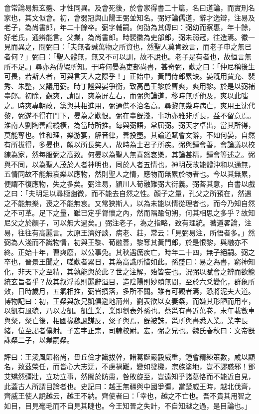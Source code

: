 \begin{pinyinscope}
會常論易無玄體、才性同異。及會死後，於會家得書二十篇，名曰道論，而實刑名家也，其文似會。初，會弱冠與山陽王弼並知名。弼好論儒道，辭才逸辯，注易及老子，為尚書郎，年二十餘卒。弼字輔嗣。何劭為其傳曰：弼幼而察惠，年十餘，好老氏，通辨能言。父業，為尚書郎。時裴徽為吏部郎，弼未弱冠，往造焉。徽一見而異之，問弼曰：「夫無者誠萬物之所資也，然聖人莫肯致言，而老子申之無已者何？」弼曰：「聖人體無，無又不可以訓，故不說也。老子是有者也，故恒言無所不足。」尋亦為傅嘏所知。于時何晏為吏部尚書，甚奇弼，歎之曰：「仲尼稱後生可畏，若斯人者，可與言天人之際乎！」正始中，黃門侍郎累缺。晏旣用賈充、裴秀、朱整，又議用弼。時丁謐與晏爭衡，致高邑王黎於曹爽，爽用黎。於是以弼補臺郎。初除，覲爽，請間，爽為屏左右，而弼與論道，移時無所他及，爽以此嗤之。時爽專朝政，黨與共相進用，弼通儁不治名高。尋黎無幾時病亡，爽用王沈代黎，弼遂不得在門下，晏為之歎恨。弼在臺旣淺，事功亦雅非所長，益不留意焉。淮南人劉陶善論縱橫，為當時所推。每與弼語，常屈弼。弼天才卓出，當其所得，莫能奪也。性和理，樂游宴，解音律，善投壺。其論道賦會文辭，不如何晏，自然有所拔得，多晏也，頗以所長笑人，故時為士君子所疾。弼與鍾會善，會論議以校練為家，然每服弼之高致。何晏以為聖人無喜怒哀樂，其論甚精，鍾會等述之。弼與不同，以為聖人茂於人者神明也，同於人者五情也，神明茂故能體沖和以通無，五情同故不能無哀樂以應物，然則聖人之情，應物而無累於物者也。今以其無累，便謂不復應物，失之多矣。弼注易，潁川人荀融難弼大衍義。弼荅其意，白書以戲之曰：「夫明足以尋極幽微，而不能去自然之性。顏子之量，孔父之所預在，然遇之不能無樂，喪之不能無哀。又常狹斯人，以為未能以情從理者也，而今乃知自然之不可革。足下之量，雖已定乎胷懷之內，然而隔踰旬朔，何其相思之多乎？故知尼父之於顏子，可以無大過矣。」弼注老子，為之指略，致有理統。著道畧論，注易，往往有高麗言。太原王濟好談，病老、莊，常云：「見弼易注，所悟者多。」然弼為人淺而不識物情，初與王黎、荀融善，黎奪其黃門郎，於是恨黎，與融亦不終。正始十年，曹爽廢，以公事免。其秋遇癘疾亡，時年二十四，無子絕嗣。弼之卒也，晉景王聞之，嗟歎者累日，其為高識所惜如此。孫盛曰：易之為書，窮神知化，非天下之至精，其孰能與於此？世之注解，殆皆妄也。況弼以賦會之辨而欲籠統玄旨者乎？故其叙浮義則麗辭溢目，造陰陽則妙賾無間，至於六爻變化，群象所效，日時歲月，五氣相推，弼皆擯落，多所不關。雖有可觀者焉，恐將泥夫大道。博物記曰：初，王粲與族兄凱俱避地荊州，劉表欲以女妻粲，而嫌其形陋而用率，以凱有風貌，乃以妻凱。凱生業，業即劉表外孫也。蔡邕有書近萬卷，末年載數車與粲，粲亡後，相國掾魏諷謀反，粲子與焉，旣被誅，邕所與書悉入業。業字長緒，位至謁者僕射。子宏字正宗，司隷校尉。宏，弼之兄也。魏氏春秋曰：文帝旣誅粲二子，以業嗣粲。

評曰：王淩風節格尚，毌丘儉才識拔幹，諸葛誕嚴毅威重，鍾會精練策數，咸以顯名，致茲榮任，而皆心大志迂，不慮禍難，變如發機，宗族塗地，豈不謬惑邪！鄧艾矯然彊壯，立功立事，然闇於防患，咎敗旋至，豈遠知乎諸葛恪而不能近自見，此蓋古人所謂目論者也。史記曰：越王無疆與中國爭彊，當楚威王時，越北伐齊，齊威王使人說越云，越王不納。齊使者曰：「幸也，越之不亡也。吾不貴其用智之如目，目見毫毛而不自見其睫也。今王知晉之失計，不自知越之過，是目論也。」


\end{pinyinscope}
